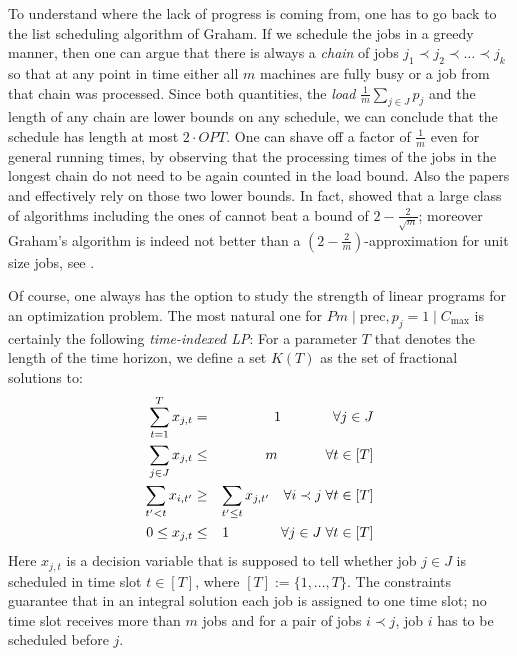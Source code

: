 \documentclass[11pt,letterpaper,oneside,english]{article}
\theoremstyle{theorem}
\begin{document}
To understand where the lack of progress is coming from, one has to go back to the 
list scheduling algorithm of Graham. If we schedule the jobs in a greedy manner, then one can argue 
that there is always a \emph{chain} of jobs $j_1 \prec j_2 \prec \ldots \prec j_k$ so that at any point in time
either all $m$ machines are fully busy or a job from that chain was processed. Since both quantities, 
the \emph{load} $\frac{1}{m} \sum_{j \in J} p_j$ and the length of any chain are lower bounds on any
schedule, we can conclude that the schedule has length at most $2 \cdot OPT$. 
One can shave off a factor of $\frac{1}{m}$ even for general running times, by observing that the 
processing times of the 
jobs in the longest chain do not need to be again counted in the load bound. 
Also the papers \cite{TwoSchedulingAlgorithms-Lam-Sethi-SICOMP77} and \cite{PrecedenceConstrainedScheduling-GangalRanade2008} effectively rely on those two lower bounds. 
In fact, \cite{TechReportCharikar1995} showed that a large class of algorithms including the
ones of \cite{Graham66,PrecedenceConstrainedScheduling-GangalRanade2008} cannot beat 
a bound of $2 - \frac{2}{\sqrt{m}}$; moreover Graham's algorithm is indeed not better than
a $(2-\frac{2}{m})$-approximation for unit size jobs, see \cite{PrecedenceConstrainedScheduling-GangalRanade2008}.


Of course, one always has the option to study the strength of linear programs for an optimization problem.
The most natural one for $Pm \mid \textrm{prec},p_j=1 \mid C_{\max}$ is certainly the following
\emph{time-indexed LP}: 
For a parameter $T$ that denotes the length of the time horizon, we define a set $K(T)$ as the set of fractional solutions to:
\begin{eqnarray}
 \sum_{t=1}^T x_{j,t} &=& 1 \hspace{1.3cm} \forall j \in J    \label{eq:LP} \\
 \sum_{j \in J} x_{j,t} &\leq& m \hspace{1.2cm} \forall t \in [T] \nonumber \\ 
 \sum_{t' < t} x_{i,t'} &\geq& \sum_{t' \leq t} x_{j,t'} \quad \forall i \prec j \; \forall t \in [T] \nonumber \\
0 \leq x_{j,t} &\leq& 1 \hspace{1.3cm} \forall j \in J \; \forall t \in [T] \nonumber
\end{eqnarray}
Here $x_{j,t}$ is a decision variable that is supposed to tell whether job $j \in J$ is scheduled in 
time slot $t \in [T]$, where $[T] := \{ 1,\ldots,T\}$. The constraints guarantee that in an integral solution each job is assigned
to one time slot; no time slot receives more than $m$ jobs and for a pair of jobs $i \prec j$, job $i$
has to be scheduled before $j$. 
\end{document}
